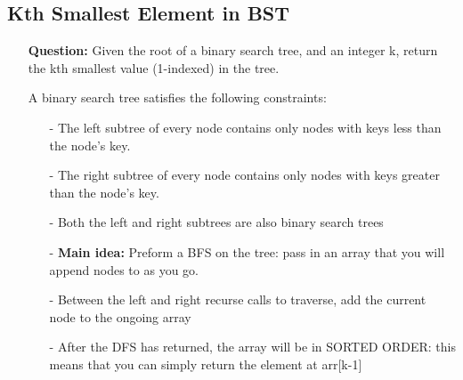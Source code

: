 \documentclass[12pt]{article}
\begin{document}
\subsection{Kth Smallest Element in BST}
\begin{enumerate}
  \item[] \textbf{Question:} Given the root of a binary search tree, and an integer k, return the kth smallest value (1-indexed) in the tree.

A binary search tree satisfies the following constraints:

\begin{enumerate}
  \item[-] The left subtree of every node contains only nodes with keys less than the node's key.
  \item[-] The right subtree of every node contains only nodes with keys greater than the node's key.
  \item[-] Both the left and right subtrees are also binary search trees
\end{enumerate}

    \begin{enumerate}
      \item[-] \textbf{Main idea:} Preform a BFS on the tree: pass in an array that you will append nodes to as you go. 
      \item[-] Between the left and right recurse calls to traverse, add the current node to the ongoing array
      \item[-] After the DFS has returned, the array will be in SORTED ORDER: this means that you can simply return the element at arr[k-1]

    \end{enumerate}
\end{enumerate}
\end{document}
